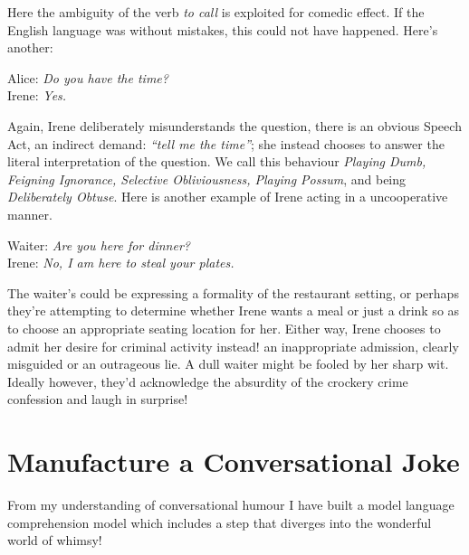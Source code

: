 Here the ambiguity of the verb \textit{to call} is exploited for comedic effect. If the English language was without mistakes, this could not have happened. Here's another:

\begin{center}
    Alice: \textit{Do you have the time?}
    \\ Irene: \textit{Yes.}
\end{center}

Again, Irene deliberately misunderstands the question, there is an obvious Speech Act, an indirect demand: \textit{``tell me the time''}; she instead chooses to answer the literal interpretation of the question. We call this behaviour \textit{Playing Dumb, Feigning Ignorance, Selective Obliviousness, Playing Possum}, and being \textit{Deliberately Obtuse}. Here is another example of Irene acting in a uncooperative manner.

\begin{center}
    Waiter: \textit{Are you here for dinner?} 
    \\ Irene: \textit{No, I am here to steal your plates.}
\end{center}

The waiter's could be expressing a formality of the restaurant setting, or perhaps they're attempting to determine whether Irene wants a meal or just a drink so as to choose an appropriate seating location for her. Either way, Irene chooses to admit her desire for criminal activity instead! an inappropriate admission, clearly misguided or an outrageous lie. A dull waiter might be fooled by her sharp wit. Ideally however, they'd acknowledge the absurdity of the crockery crime confession and laugh in surprise!





\section{Manufacture a Conversational Joke}
From my understanding of conversational humour I have built a model language comprehension model which includes a step that diverges into the wonderful world of whimsy!

